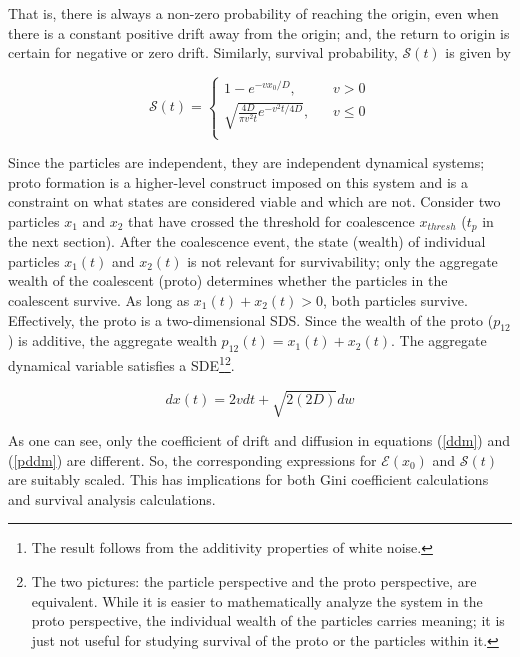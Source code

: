 \noindent That is, there is always a non-zero probability of reaching the origin, even when there is a constant positive drift away from the origin; and, the return to origin is certain for negative or zero drift.  Similarly, survival probability, $\mathcal{S}(t)$ is given by 

\begin{equation}\label{s}
\mathcal{S}(t) = \begin{cases}
1 - e^{-v x_0/D}\text{, } & \text{ } v >0 \\
\sqrt{\frac{4D}{\pi v^2 t} e^{-v^2 t/4 D}}\text{, } & \text{ } v \leq 0 \\
\end{cases}
\end{equation}

Since the particles are independent, they are independent dynamical systems; proto formation is a higher-level construct imposed on this system and is a constraint on what states are considered viable and which are not. Consider two particles $x_1$ and  $x_2$ that have crossed the threshold for coalescence $x_{thresh}$ ($t_p$ in the next section). After the coalescence event, the state (wealth) of individual particles $x_1(t)$ and  $x_2(t)$ is not relevant for survivability; only the aggregate wealth of the coalescent (proto) determines whether the particles in the coalescent survive. As long as $x_1(t) + x_2(t) >0$, both particles survive. Effectively, the proto is a two-dimensional SDS. Since the wealth of the proto ($p_{12}$) is additive, the aggregate wealth $p_{12}(t) = x_1(t) + x_2(t) $. The aggregate dynamical variable satisfies a SDE\footnote{The result follows from the additivity properties of white noise.}\footnote{The two pictures: the particle perspective and the proto perspective, are equivalent. While it is easier to mathematically analyze the system in the proto perspective, the individual wealth of the particles carries meaning; it is just not useful for studying survival of the proto or the particles within it.}.  

\begin{equation}\label{pddm}
dx(t) = 2vdt + \sqrt{2(2D)} dw
\end{equation}

As one can see, only the coefficient of drift and diffusion in equations (\ref{ddm}) and (\ref{pddm}) are different. So, the corresponding expressions for $\mathcal{E}(x_0)$ and $\mathcal{S}(t)$ are suitably scaled. This has implications for both Gini coefficient calculations and survival analysis calculations. 


